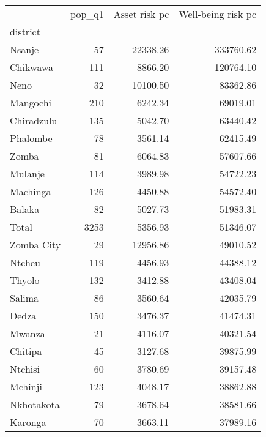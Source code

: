 \begin{tabular}{lrrr}
\toprule
{} &  pop\_q1 &  Asset risk pc &  Well-being risk pc \\
district      &         &                &                     \\
\midrule
Nsanje        &      57 &       22338.26 &           333760.62 \\
Chikwawa      &     111 &        8866.20 &           120764.10 \\
Neno          &      32 &       10100.50 &            83362.86 \\
Mangochi      &     210 &        6242.34 &            69019.01 \\
Chiradzulu    &     135 &        5042.70 &            63440.42 \\
Phalombe      &      78 &        3561.14 &            62415.49 \\
Zomba         &      81 &        6064.83 &            57607.66 \\
Mulanje       &     114 &        3989.98 &            54722.23 \\
Machinga      &     126 &        4450.88 &            54572.40 \\
Balaka        &      82 &        5027.73 &            51983.31 \\
Total         &    3253 &        5356.93 &            51346.07 \\
Zomba City    &      29 &       12956.86 &            49010.52 \\
Ntcheu        &     119 &        4456.93 &            44388.12 \\
Thyolo        &     132 &        3412.88 &            43408.04 \\
Salima        &      86 &        3560.64 &            42035.79 \\
Dedza         &     150 &        3476.37 &            41474.31 \\
Mwanza        &      21 &        4116.07 &            40321.54 \\
Chitipa       &      45 &        3127.68 &            39875.99 \\
Ntchisi       &      60 &        3780.69 &            39157.48 \\
Mchinji       &     123 &        4048.17 &            38862.88 \\
Nkhotakota    &      79 &        3678.64 &            38581.66 \\
Karonga       &      70 &        3663.11 &            37989.16 \\

\end{tabular}
